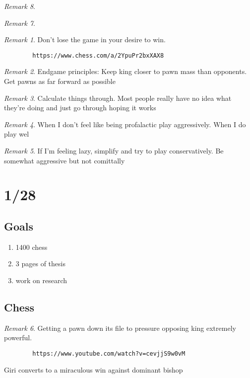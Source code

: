 \documentclass[11pt]{article}
\theoremstyle{remark}
\newtheorem{remark}{Remark}
\begin{document}
\begin{remark}
\begin{remark}
\begin{remark}
	Don't lose the game in your desire to win.
	\begin{verbatim}
		https://www.chess.com/a/2YpuPr2bxXAX8
	\end{verbatim}
\end{remark}

\begin{remark}
	Endgame principles: Keep king closer to pawn mass than opponents. Get pawns as far forward as possible
\end{remark}

\begin{remark}
	Calculate things through. Most people really have no idea what they're doing and just go through hoping it works
\end{remark}

\begin{remark}
	When I don't feel like being profalactic play aggressively. When I do play wel
\end{remark}

\begin{remark}
	If I'm feeling lazy, simplify and try to play conservatively. Be somewhat aggressive but not comittally
\end{remark}

\section{1/28}

\subsection{Goals}

\begin{enumerate}
	\item 1400 chess
	\item 3 pages of thesis
	\item work on research
\end{enumerate}

\subsection{Chess}

\begin{remark}
	Getting a pawn down its file to pressure opposing king extremely powerful. 
	\begin{verbatim}
		https://www.youtube.com/watch?v=cevjjS9w0vM
	\end{verbatim}
	Giri converts to a miraculous win against dominant bishop
\end{remark}


\end{remark}
\end{remark}
\end{document}
